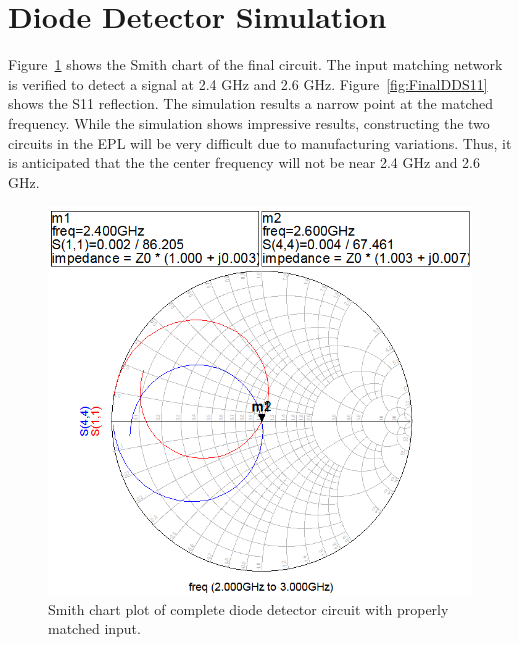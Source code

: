 \documentclass[conference]{IEEEtran}
\begin{document}
\section{Diode Detector Simulation}
Figure~\ref{fig:FinalDDSmith} shows the Smith chart of the final circuit.  The input matching network is verified to detect a signal at 2.4 GHz and 2.6 GHz.  Figure~\ref{fig:FinalDDS11} shows the S11 reflection.  The simulation results a narrow point at the matched frequency.  While the simulation shows impressive results, constructing the two circuits in the EPL will be very difficult due to manufacturing variations.  Thus, it is anticipated that the the center frequency will not be near 2.4 GHz and 2.6 GHz.

\begin{figure}[!htb]
\centering
\includegraphics[scale=0.4]{diode-pics/diodedetectorSmithmatched-final.png}
\caption{Smith chart plot of complete diode detector circuit with properly matched input.}
\label{fig:FinalDDSmith}
\end{figure}
\end{document}
